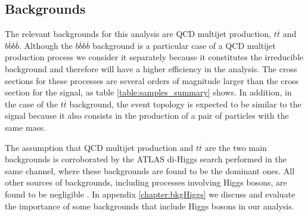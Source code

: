 

\subsection{Backgrounds}

The relevant backgrounds for this analysis are QCD multijet production, $t\overline{t}$ and $b\overline{b}b\overline{b}$. Although the $b\overline{b}b\overline{b}$ background is a particular case of a QCD multijet production process we consider it separately because it constitutes the irreducible background and therefore will have a higher efficiency in the analysis. The cross sections for these processes are several orders of magnitude larger than the cross section for the signal, as table \ref{table:samples_summary} shows. In addition, in the case of the $t\overline{t}$ background, the event topology is expected to be similar to the signal because it also consists in the production of a pair of particles with the same mass.

The assumption that QCD multijet production and $t\overline{t}$ are the two main backgrounds is corroborated by the ATLAS di-Higgs search performed in the same channel, where these backgrounds are found to be the dominant ones. All other sources of backgrounds, including processes involving Higgs bosons, are found to be negligible \cite{hh2bbbbATLAS}. In appendix \ref{chapter:bkgHiggs} we discuss and evaluate the importance of some backgrounds that include Higgs bosons in our analysis.

